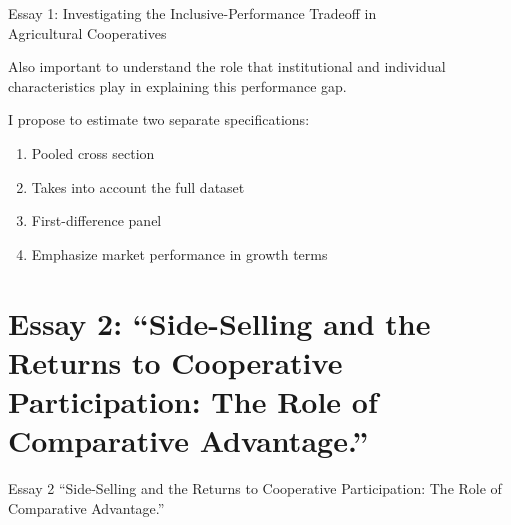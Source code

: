 \documentclass[aspectratio=169]{beamer}
\newenvironment{wideitemize}{\itemize\addtolength{\itemsep}{10pt}}{\enditemize}
\begin{document}
\begin{frame}{Essay 1: Investigating the Inclusive-Performance Tradeoff in \\ \hspace{1.7cm} Agricultural Cooperatives}
    \begin{wideitemize}
        \item Also important to understand the role that institutional and individual characteristics play in explaining this performance gap. 
        \item I propose to estimate two separate specifications: \vspace{.25cm}
            \begin{enumerate}
                \item Pooled cross section
                    \begin{wideitemize}
                        \item Takes into account the full dataset \vspace{.25cm}
                    \end{wideitemize}
                \item First-difference panel
                    \begin{wideitemize}
                        \item Emphasize market performance in growth terms
                    \end{wideitemize}
            \end{enumerate}
    \end{wideitemize}    
\end{frame}


\section{Essay 2: ``Side-Selling and the Returns to Cooperative Participation: The Role of Comparative Advantage.''}
\begin{frame}{Essay 2}
\centering
\Large{``Side-Selling and the Returns to Cooperative Participation: The Role of Comparative Advantage.''}
\end{frame}
\end{document}

